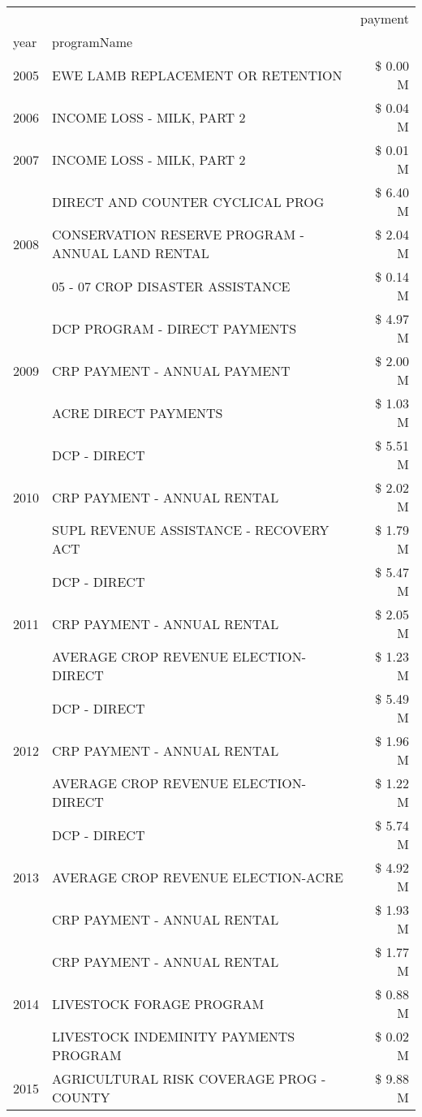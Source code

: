 \begin{tabular}{llr}
\toprule
 &  & payment \\
year & programName &  \\
\midrule
2005 & EWE LAMB REPLACEMENT OR RETENTION & \$ 0.00 M \\
\cline{1-3}
2006 & INCOME LOSS - MILK, PART 2 & \$ 0.04 M \\
\cline{1-3}
2007 & INCOME LOSS - MILK, PART 2 & \$ 0.01 M \\
\cline{1-3}
\multirow[t]{3}{*}{2008} & DIRECT AND COUNTER CYCLICAL PROG & \$ 6.40 M \\
 & CONSERVATION RESERVE PROGRAM - ANNUAL LAND RENTAL & \$ 2.04 M \\
 & 05 - 07 CROP DISASTER ASSISTANCE & \$ 0.14 M \\
\cline{1-3}
\multirow[t]{3}{*}{2009} & DCP PROGRAM - DIRECT PAYMENTS & \$ 4.97 M \\
 & CRP PAYMENT - ANNUAL PAYMENT & \$ 2.00 M \\
 & ACRE DIRECT PAYMENTS & \$ 1.03 M \\
\cline{1-3}
\multirow[t]{3}{*}{2010} & DCP - DIRECT & \$ 5.51 M \\
 & CRP PAYMENT - ANNUAL RENTAL & \$ 2.02 M \\
 & SUPL REVENUE ASSISTANCE - RECOVERY ACT & \$ 1.79 M \\
\cline{1-3}
\multirow[t]{3}{*}{2011} & DCP - DIRECT & \$ 5.47 M \\
 & CRP PAYMENT - ANNUAL RENTAL & \$ 2.05 M \\
 & AVERAGE CROP REVENUE ELECTION-DIRECT & \$ 1.23 M \\
\cline{1-3}
\multirow[t]{3}{*}{2012} & DCP - DIRECT & \$ 5.49 M \\
 & CRP PAYMENT - ANNUAL RENTAL & \$ 1.96 M \\
 & AVERAGE CROP REVENUE ELECTION-DIRECT & \$ 1.22 M \\
\cline{1-3}
\multirow[t]{3}{*}{2013} & DCP - DIRECT & \$ 5.74 M \\
 & AVERAGE CROP REVENUE ELECTION-ACRE & \$ 4.92 M \\
 & CRP PAYMENT - ANNUAL RENTAL & \$ 1.93 M \\
\cline{1-3}
\multirow[t]{3}{*}{2014} & CRP PAYMENT - ANNUAL RENTAL & \$ 1.77 M \\
 & LIVESTOCK FORAGE PROGRAM & \$ 0.88 M \\
 & LIVESTOCK INDEMINITY PAYMENTS PROGRAM & \$ 0.02 M \\
\cline{1-3}
\multirow[t]{3}{*}{2015} & AGRICULTURAL RISK COVERAGE PROG - COUNTY & \$ 9.88 M \\

\end{tabular}
